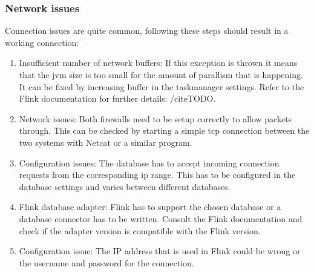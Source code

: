 \subsubsection{Network issues}
\label{mdfCorrectNetwork}
Connection issues are quite common, following these steps should result in a working connection:
\begin{enumerate}
  \item Insufficient number of network buffers: If this exception is thrown it means that the jvm size is too small for the amount of parallism that is happening. It can be fixed by increasing buffer in the taskmanager settings. Refer to the Flink documentation for further details: /cite{TODO}.
  \item Network issues: Both firewalls need to be setup correctly to allow packets through. This can be checked by starting a simple tcp connection between the two systems with Netcat or a similar program.
  \item Configuration issues: The database has to accept incoming connection requests from the corresponding ip range. This has to be configured in the database settings and varies between different databases.
  \item Flink database adapter: Flink has to support the chosen database or a database connector has to be written. Consult the Flink documentation and check if the adapter version is compatible with the Flink version.
  \item Configuration issue: The IP address that is used in Flink could be wrong or the username and password for the connection.
\end{enumerate}

